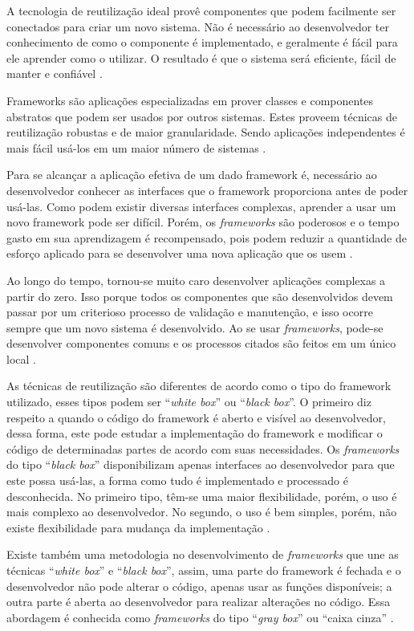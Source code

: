 A tecnologia de reutilização ideal provê componentes que podem facilmente ser conectados para criar um novo sistema. Não é necessário ao desenvolvedor ter conhecimento de como o componente é implementado, e geralmente é fácil para ele aprender como o utilizar. O resultado é que o sistema será eficiente, fácil de manter e confiável \cite{Johnson:1997}.

Frameworks são aplicações especializadas em prover classes e componentes abstratos que podem ser usados por outros sistemas. Estes proveem técnicas de reutilização robustas e de maior granularidade. Sendo aplicações independentes é mais fácil usá-los em um maior número de sistemas \cite{Johnson:Foote:1988}.

Para se alcançar a aplicação efetiva de um dado framework é, necessário ao desenvolvedor conhecer as interfaces que o framework proporciona antes de poder usá-las. Como podem existir diversas interfaces complexas, aprender a usar um novo framework pode ser difícil. Porém, os \textit{frameworks} são poderosos e o tempo gasto em sua aprendizagem é recompensado, pois podem reduzir a quantidade de esforço aplicado para se desenvolver uma nova aplicação que os usem \cite{Johnson:1997}.

Ao longo do tempo, tornou-se muito caro desenvolver aplicações complexas a partir do zero. Isso porque todos os componentes que são desenvolvidos devem passar por um criterioso processo de validação e manutenção, e isso ocorre sempre que um novo sistema é desenvolvido. Ao se usar \textit{frameworks}, pode-se desenvolver componentes comuns e os processos citados são feitos em um único local \cite{Fayad:Schimidt:1997}.

As técnicas de reutilização são diferentes de acordo como o tipo do framework utilizado, esses tipos podem ser ``\textit{white box}'' ou ``\textit{black box}''. O primeiro diz respeito a quando o código do framework é aberto e visível ao desenvolvedor, dessa forma, este pode estudar a implementação do framework e modificar o código de determinadas partes de acordo com suas necessidades. Os \textit{frameworks} do tipo ``\textit{black box}'' disponibilizam apenas interfaces ao desenvolvedor para que este possa usá-las, a forma como tudo é implementado e processado é desconhecida. No primeiro tipo, têm-se uma maior flexibilidade, porém, o uso é mais complexo ao desenvolvedor. No segundo, o uso é bem simples, porém, não existe flexibilidade para mudança da implementação \cite{Kroth:2000}.

Existe também uma metodologia no desenvolvimento de \textit{frameworks} que une as técnicas ``\textit{white box}'' e ``\textit{black box}'', assim, uma parte do framework é fechada e o desenvolvedor não pode alterar o código, apenas usar as funções disponíveis; a outra parte é aberta ao desenvolvedor para realizar alterações no código. Essa abordagem é conhecida como \textit{frameworks} do tipo ``\textit{gray box}'' ou ``caixa cinza'' \cite{Kristensen:2004}.

